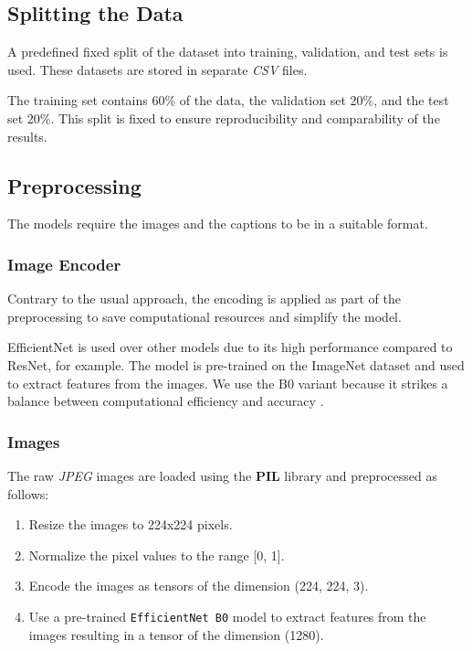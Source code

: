 \documentclass[12pt]{article}
\theoremstyle{plain}
\theoremstyle{definition}
\theoremstyle{remark}
\begin{document}
\subsection{Splitting the Data}\label{sec:splitting}
A predefined fixed split of the dataset into training, validation, and test sets is used. These datasets are stored in separate \textit{CSV} files.
\par The training set contains 60\% of the data, the validation set 20\%, and the test set 20\%. This split is fixed to ensure reproducibility and comparability of the results.


\subsection{Preprocessing}\label{sec:preprocessing}
The models require the images and the captions to be in a suitable format.

\subsubsection{Image Encoder}\label{sec:image-encoder}
Contrary to the usual approach, the encoding is applied as part of the preprocessing to save computational resources and simplify the model.
\par EfficientNet is used over other models due to its high performance compared to ResNet, for example. The model is pre-trained on the ImageNet dataset and used to extract features from the images. We use the B0 variant because it strikes a balance between computational efficiency and accuracy \cite{tan2019efficientnet}.

\subsubsection{Images}\label{sec:images}
The raw \textit{JPEG} images are loaded using the \textbf{PIL} library and preprocessed as follows:
\begin{enumerate}
    \item Resize the images to 224x224 pixels.
    \item Normalize the pixel values to the range [0, 1].
    \item Encode the images as tensors of the dimension (224, 224, 3).
    \item Use a pre-trained \texttt{EfficientNet B0} model to extract features from the images resulting in a tensor of the dimension (1280).
\end{enumerate}
\end{document}
